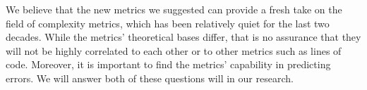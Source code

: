 We believe that the new metrics we suggested can provide a fresh take on the field of complexity metrics, which has been relatively quiet for the last two decades.
While the metrics' theoretical bases differ, that is no assurance that they will not be highly correlated to each other or to other metrics such as lines of code.
Moreover, it is important to find the metrics' capability in predicting errors.
We will answer both of these questions will in our research.